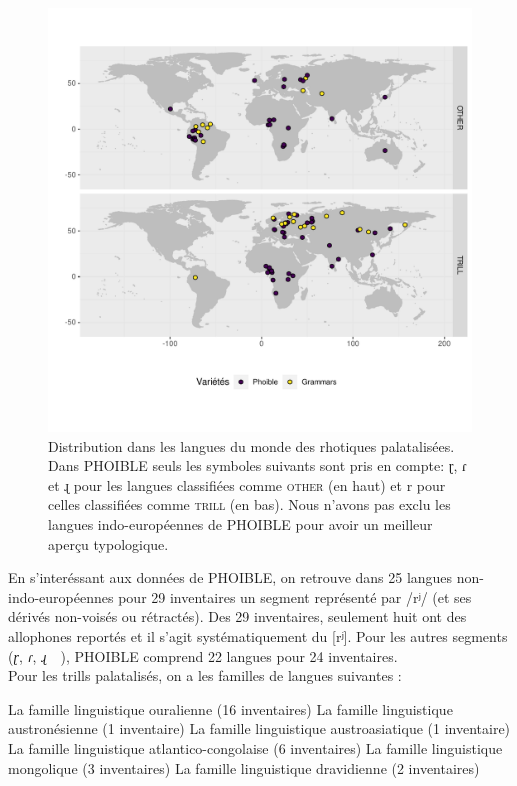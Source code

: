 \begin{figure}
	\centering
	\includegraphics[width=1\linewidth,
	trim={0 1.65cm 0 1.65cm}, clip]{substance/images/rhotiques_palatalization}
	\caption[Distribution dans les langues du monde des rhotiques palatalisées]{Distribution dans les langues du monde des rhotiques palatalisées. Dans PHOIBLE seuls les symboles suivants sont pris en compte: ɽ, ɾ et ɻ pour les langues classifiées comme \textsc{other} (en haut) et r pour celles classifiées comme \textsc{trill} (en bas). Nous n'avons pas exclu les langues indo-européennes de PHOIBLE pour avoir un meilleur aperçu typologique.}
	\label{fig:rhotiquespalatalization}
\end{figure}

En s'interéssant aux données de PHOIBLE, on retrouve dans 25 langues non-indo-européennes pour 29 inventaires un segment représenté par /rʲ/ (et ses dérivés non-voisés ou rétractés). Des 29 inventaires, seulement huit ont des allophones reportés et il s'agit systématiquement du [rʲ].
Pour les autres segments  (\textit{ɽ}, \textit{ɾ}, \textit{ɻ}~~), PHOIBLE comprend 22 langues pour 24 inventaires.\\


Pour les trills palatalisés, on a les familles de langues suivantes :

\begin{exe}
	\ex \begin{xlist}
	\ex La famille linguistique ouralienne  (16 inventaires)
	\ex La famille linguistique austronésienne  (1 inventaire)
	\ex La famille linguistique austroasiatique  (1 inventaire)
	\ex La famille linguistique atlantico-congolaise  (6 inventaires)
	\ex La famille linguistique mongolique   (3 inventaires)
	\ex La famille linguistique dravidienne  (2 inventaires)
	\end{xlist}
\end{exe}

